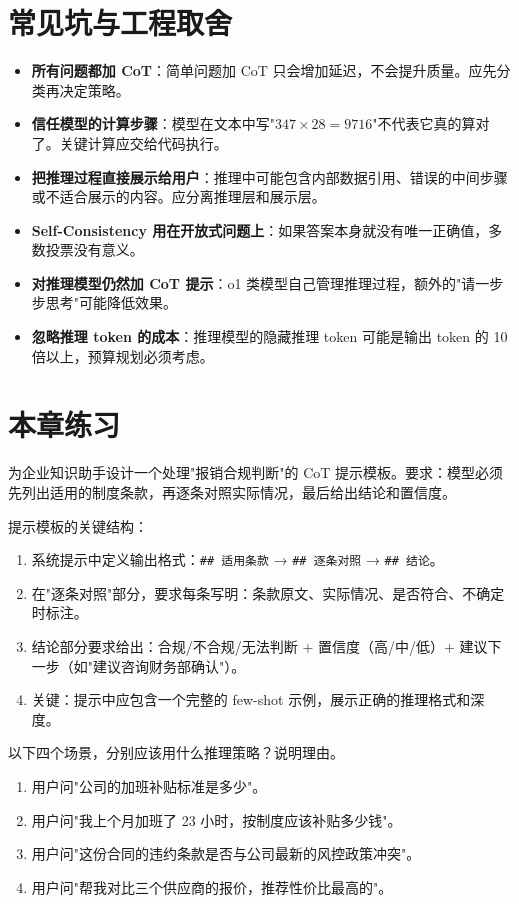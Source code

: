 \section{常见坑与工程取舍}
\begin{itemize}
  \item \textbf{所有问题都加 CoT}：简单问题加 CoT 只会增加延迟，不会提升质量。应先分类再决定策略。
  \item \textbf{信任模型的计算步骤}：模型在文本中写"$347 \times 28 = 9716$"不代表它真的算对了。关键计算应交给代码执行。
  \item \textbf{把推理过程直接展示给用户}：推理中可能包含内部数据引用、错误的中间步骤或不适合展示的内容。应分离推理层和展示层。
  \item \textbf{Self-Consistency 用在开放式问题上}：如果答案本身就没有唯一正确值，多数投票没有意义。
  \item \textbf{对推理模型仍然加 CoT 提示}：o1 类模型自己管理推理过程，额外的"请一步步思考"可能降低效果。
  \item \textbf{忽略推理 token 的成本}：推理模型的隐藏推理 token 可能是输出 token 的 10 倍以上，预算规划必须考虑。
\end{itemize}

\section{本章练习}
\begin{exercise}[设计 CoT 提示]
为企业知识助手设计一个处理"报销合规判断"的 CoT 提示模板。要求：模型必须先列出适用的制度条款，再逐条对照实际情况，最后给出结论和置信度。
\end{exercise}

\begin{solution}
提示模板的关键结构：
\begin{enumerate}
  \item 系统提示中定义输出格式：\texttt{\#\# 适用条款} → \texttt{\#\# 逐条对照} → \texttt{\#\# 结论}。
  \item 在"逐条对照"部分，要求每条写明：条款原文、实际情况、是否符合、不确定时标注。
  \item 结论部分要求给出：合规/不合规/无法判断 + 置信度（高/中/低）+ 建议下一步（如"建议咨询财务部确认"）。
  \item 关键：提示中应包含一个完整的 few-shot 示例，展示正确的推理格式和深度。
\end{enumerate}
\end{solution}

\begin{exercise}[推理策略选择]
以下四个场景，分别应该用什么推理策略？说明理由。
\begin{enumerate}
  \item 用户问"公司的加班补贴标准是多少"。
  \item 用户问"我上个月加班了 23 小时，按制度应该补贴多少钱"。
  \item 用户问"这份合同的违约条款是否与公司最新的风控政策冲突"。
  \item 用户问"帮我对比三个供应商的报价，推荐性价比最高的"。
\end{enumerate}
\end{exercise}

